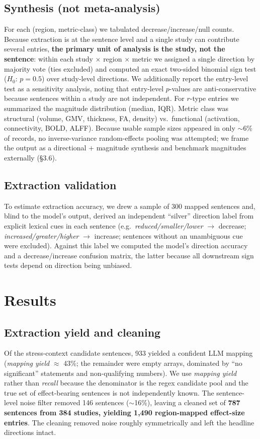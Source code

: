 \documentclass[11pt]{article}
\begin{document}
\subsection{Synthesis (not meta-analysis)}
For each (region, metric-class) we tabulated decrease/increase/null counts.
Because extraction is at the sentence level and a single study can contribute
several entries, \textbf{the primary unit of analysis is the study, not the
sentence}: within each study $\times$ region $\times$ metric we assigned a single
direction by majority vote (ties excluded) and computed an exact two-sided
binomial sign test ($H_0$: $p=0.5$) over study-level directions. We additionally
report the entry-level test as a sensitivity analysis, noting that entry-level
$p$-values are anti-conservative because sentences within a study are not
independent. For $r$-type entries we summarized the magnitude distribution
(median, IQR). Metric class was structural (volume, GMV, thickness, FA, density)
vs.\ functional (activation, connectivity, BOLD, ALFF). Because usable sample
sizes appeared in only $\sim$6\% of records, no inverse-variance random-effects
pooling was attempted; we frame the output as a directional + magnitude
synthesis and benchmark magnitudes externally (\S3.6).

\subsection{Extraction validation}
To estimate extraction accuracy, we drew a sample of 300 mapped sentences and,
blind to the model's output, derived an independent ``silver'' direction label
from explicit lexical cues in each sentence (e.g.\ \emph{reduced/smaller/lower}
$\to$ decrease; \emph{increased/greater/higher} $\to$ increase; sentences without
an unambiguous cue were excluded). Against this label we computed the model's
direction accuracy and a decrease/increase confusion matrix, the latter because
all downstream sign tests depend on direction being unbiased.

\section{Results}

\subsection{Extraction yield and cleaning}
Of the stress-context candidate sentences, 933 yielded a confident LLM mapping
(\emph{mapping yield} $\approx$ 43\%; the remainder were empty arrays, dominated
by ``no significant'' statements and non-qualifying numbers). We use
\emph{mapping yield} rather than \emph{recall} because the denominator is the
regex candidate pool and the true set of effect-bearing sentences is not
independently known. The sentence-level noise filter removed 146 sentences
($\sim$16\%), leaving a cleaned set of \textbf{787 sentences from 384 studies,
yielding 1{,}490 region-mapped effect-size entries}. The cleaning removed noise
roughly symmetrically and left the headline directions intact.
\end{document}
